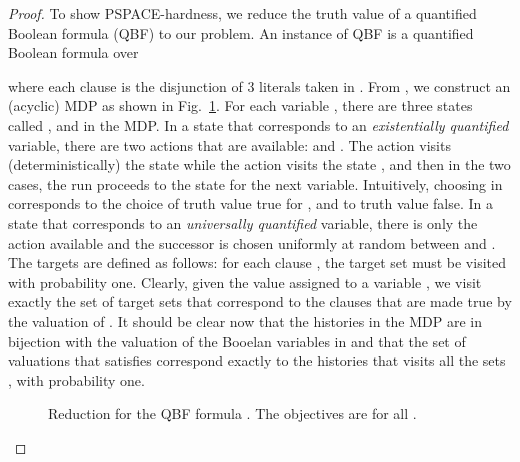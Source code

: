 \documentclass{llncs}
\newcommand\PSPACE{\textrm{\sf PSPACE}}
\begin{document}
\begin{proof}
  
  
  To show \PSPACE-hardness, we reduce the truth value of a quantified Boolean formula (QBF) to our problem. An instance of QBF is a quantified Boolean formula over 
  

   
   \noindent
    where each clause  is the disjunction of 3 literals taken in . 
    From , we construct an (acyclic) MDP as shown in Fig.~\ref{fig:qbf}. For each variable , there are three states called ,  and  in the MDP. In a state  that corresponds to an {\em existentially quantified} variable, there are two actions that are available:  and . The action  visits (deterministically) the state  while the action  visits the state , and then in the two cases, the run proceeds to the state for the next variable.  Intuitively, choosing  in  corresponds to the choice of truth value {\sf true} for , and  to truth value {\sf false}. In a state  that corresponds to an {\em universally quantified} variable, there is only the action  available and the successor is chosen uniformly at random between  and . The targets are defined as follows: for each clause , the target set  must be visited with probability one. Clearly, given the value assigned to a variable , we visit exactly the set of target sets  that correspond to the clauses that are made true by the valuation of . It should be clear now that the histories in the MDP are in bijection with the valuation of the Booelan variables in  and that the set of valuations that satisfies  correspond exactly to the histories that visits all the sets ,  with probability one.  
    
    

\begin{figure}[t]
  \centering  
  \caption{Reduction for the QBF formula
    .
  The objectives are 
for all .}
  \label{fig:qbf}
\end{figure}


\end{proof}
\end{document}
